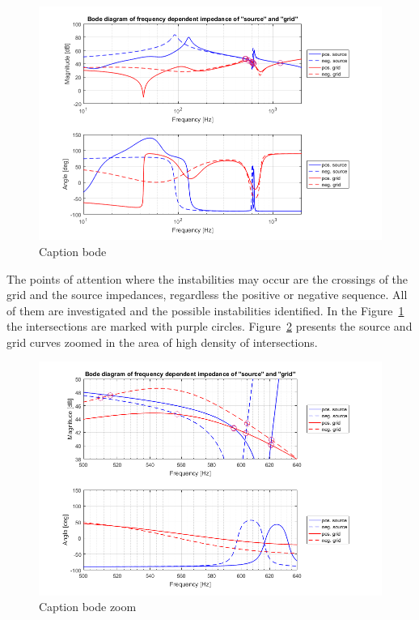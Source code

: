 \documentclass[12pt]{report} %
\begin{document}
\begin{figure}[htb]
	\centering
	\includegraphics[width=1\textwidth]{img/Case1/Case1_Bode.png}
	\caption{Caption bode}
  	\label{fig:bode_case1}
\end{figure}
\FloatBarrier

The points of attention where the instabilities may occur are the crossings of the grid and the source impedances, regardless the positive or negative sequence. All of them are investigated and the possible instabilities identified. In the Figure~\ref{fig:bode_case1} the intersections are marked with purple circles. Figure~\ref{fig:bode_zoom_case1} presents the source and grid curves zoomed in the area of high density of intersections.

\begin{figure}[htb]
	\centering
	\includegraphics[width=1\textwidth]{img/Case1/Case1_Bode_zoom.png}
	\caption{Caption bode zoom}
  	\label{fig:bode_zoom_case1}
\end{figure}
\FloatBarrier
\end{document}
